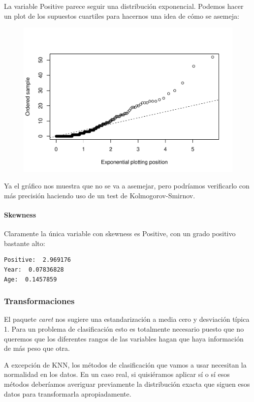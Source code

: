 \newpage

La variable Positive parece seguir una distribución exponencial. Podemos hacer un plot de los supuestos cuartiles para hacernos una idea de cómo se asemeja:

\begin{figure}[H]\includegraphics[width=.9\linewidth]{img/EDA2_files/figure-latex/unnamed-chunk-20-1} \caption{}\end{figure}

Ya el gráfico nos muestra que no se va a asemejar, pero podríamos verificarlo con más precisión haciendo uso de un test de Kolmogorov-Smirnov.

\paragraph{Skewness}
Claramente la única variable con skewness es Positive, con un grado positivo bastante alto:
\begin{verbatim}
Positive:  2.969176
Year:  0.07836828
Age:  0.1457859
\end{verbatim}

\subsubsection{Transformaciones}

El paquete \textit{caret} nos sugiere una estandarización a media cero y desviación típica 1. Para un problema de clasificación esto es totalmente necesario puesto que no queremos que los diferentes rangos de las variables hagan que haya información de más peso que otra.

\vspace{\baselineskip}

A excepción de KNN, los métodos de clasificación que vamos a usar necesitan la normalidad en los datos. En un caso real, si quisiéramos aplicar sí o sí esos métodos deberíamos averiguar previamente la distribución exacta que siguen esos datos para transformarla apropiadamente. 

